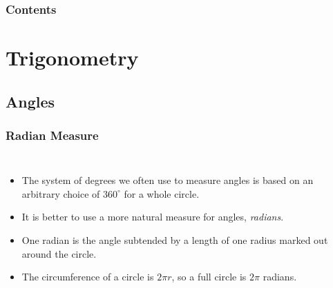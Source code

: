 \documentclass[serif,ignorenonframetext]{beamer}
\title{\commonTitleZeroZeroD}
\subtitle{\commonSubtitleZeroZeroD}
\author{\commonAuthor}
\institute{\commonInstitute}
\date{\commonDateZeroZeroD}
\begin{document}

\begin{frame}
  \titlepage
\end{frame}

\begin{frame}
  \frametitle{Contents}
  \tableofcontents
\end{frame}


\section{Trigonometry}


\subsection{Angles}

\begin{frame}
  \frametitle{Radian Measure}
  \begin{columns}
  \begin{itemize}[<+->]
  \item The system of degrees we often use to measure angles is based
    on an arbitrary choice of $360^{\circ}$ for a whole circle.
  \item It is better to use a more natural measure for angles,
    \textit{radians}. 
  \item One radian is the angle subtended by a length of one radius
    marked out around the circle.
  \item The circumference of a circle is $2\pi r$, so a full circle is
    $2\pi$ radians.
  \end{itemize}
  \end{columns}
\end{frame}
\end{document}
